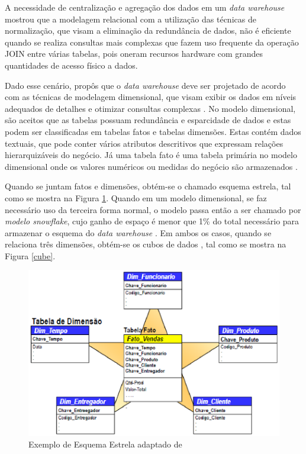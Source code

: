 {A necessidade de centralização e agregação dos dados em um \textit{data warehouse} mostrou que a modelagem relacional com a utilização das técnicas de normalização, que visam a eliminação da redundância de dados, não é eficiente quando se realiza consultas mais complexas que fazem uso frequente da operação JOIN entre várias tabelas, pois oneram recursos hardware com grandes quantidades de acesso físico a dados. \cite{Kimball2002}

Dado esse cenário,  propôs que o \textit{data warehouse} deve ser projetado de acordo com as técnicas de modelagem dimensional, que visam exibir os dados em níveis adequados de detalhes e otimizar consultas complexas \cite{valeria2012}. No modelo dimensional, são aceitos que as tabelas possuam redundância e esparcidade de dados e estas podem ser classificadas em tabelas fatos e tabelas dimensões. Estas contém dados textuais, que pode conter vários atributos descritivos que expressam relações hierarquizáveis do negócio. Já uma tabela fato é uma tabela primária no modelo dimensional onde os valores numéricos ou medidas do negócio são armazenados \cite{Kimball2002}. 


Quando se juntam fatos e dimensões, obtém-se o chamado esquema estrela, tal como se mostra na Figura \ref{estrela}. Quando em um modelo dimensional, se faz necessário uso da terceira forma normal, o modelo passa então a ser chamado por \textit{modelo snowflake}, cujo ganho de espaço é menor que 1\% do total necessário para armazenar o esquema do \textit{data warehouse} . Em ambos os casos, quando se relaciona três dimensões, obtém-se os cubos de dados \cite{Kimball2002}, tal como se mostra na Figura \ref{cube}.


\begin{figure}[ht!]
\centering
\includegraphics[keepaspectratio=true,scale=0.2]{figuras/star_schema.eps}
\caption{Exemplo de Esquema Estrela adaptado de }
\label{estrela}
\end{figure}
\FloatBarrier


}
